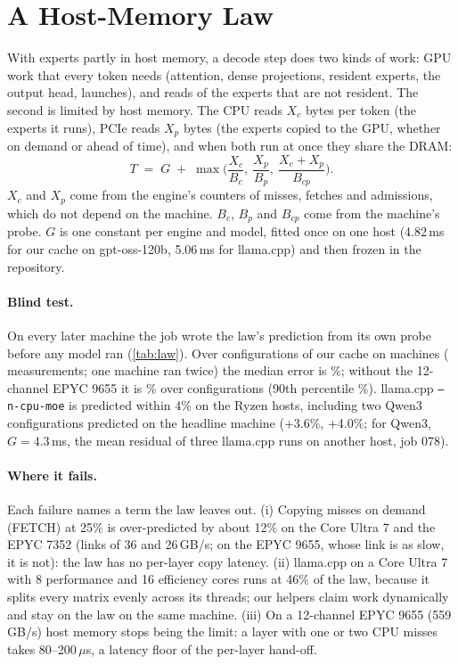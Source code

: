 \documentclass[10pt,twocolumn]{article}
\begin{document}
\section{A Host-Memory Law}\label{sec:law}
With experts partly in host memory, a decode step does two kinds of work: GPU work that every token needs (attention,
dense projections, resident experts, the output head, launches), and reads of the experts that are not resident. The
second is limited by host memory. The CPU reads $X_c$ bytes per token (the experts it runs), PCIe reads $X_p$ bytes
(the experts copied to the GPU, whether on demand or ahead of time), and when both run at once they share the DRAM:
\begin{equation}
T \;=\; G \;+\; \max\!\Big(\frac{X_c}{B_c},\ \frac{X_p}{B_p},\ \frac{X_c+X_p}{B_{cp}}\Big).
\label{eq:law}
\end{equation}
$X_c$ and $X_p$ come from the engine's counters of misses, fetches and admissions, which do not depend on the machine.
$B_c$, $B_p$ and $B_{cp}$ come from the machine's probe. $G$ is one constant per engine and model, fitted once on one
host (4.82\,ms for our cache on gpt-oss-120b, 5.06\,ms for llama.cpp) and then frozen in the repository.



\paragraph{Blind test.} On every later machine the job wrote the law's prediction from its own probe before any model
ran (\cref{tab:law}). Over \lawCfg{} configurations of our cache on \lawHosts{} machines (\lawMeas{} measurements; one
machine ran twice) the median error is \lawMedian\%; without the 12-channel EPYC 9655 it is \lawDeskMedian\% over
\lawDeskN{} configurations (90th percentile \lawDeskPninety\%). llama.cpp \texttt{--n-cpu-moe} is predicted within 4\% on
the Ryzen hosts, including two Qwen3 configurations predicted on the headline machine (+3.6\%, +4.0\%; for Qwen3,
$G{=}4.3$\,ms, the mean residual of three llama.cpp runs on another host, job 078).

\paragraph{Where it fails.} Each failure names a term the law leaves out. (i) Copying misses on demand (FETCH) at 25\% is over-predicted by about 12\% on the Core Ultra 7 and the EPYC 7352
(links of 36 and 26\,GB/s; on the EPYC 9655, whose link is as slow, it is not): the law has no per-layer copy
latency.
(ii) llama.cpp on a Core Ultra 7 with 8 performance and 16 efficiency cores runs at 46\% of the law, because it splits
every matrix evenly across its threads; our helpers claim work dynamically and stay on the law on the same machine.
(iii) On a 12-channel EPYC 9655 (559\,GB/s) host memory stops being the limit: a layer with one or two CPU misses
takes 80--200\,$\mu$s, a latency floor of the per-layer hand-off.
\end{document}
